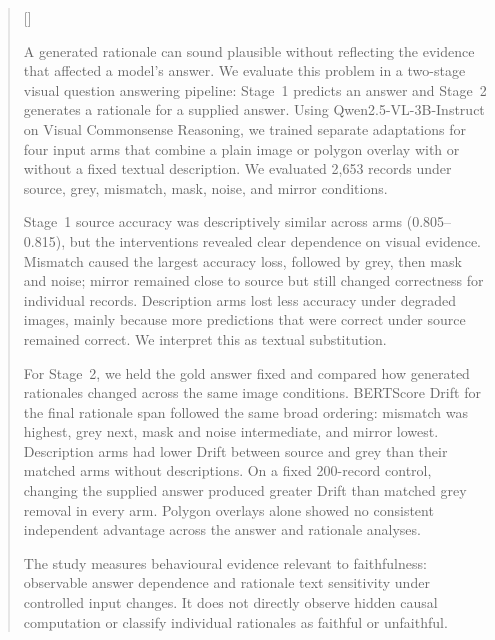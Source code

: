 \documentclass[
12pt,
oneside,
english,
onehalfspacing,
nolistspacing,
parskip,
headsepline,
]{MastersDoctoralThesis}
\begin{document}
\begin{abstract}[]
\addchaptertocentry{\abstractname}
\begin{singlespace}
\footnotesize
\setlength{\parskip}{0.1em}
\noindent A generated rationale can sound plausible without reflecting the
evidence that affected a model's answer. We evaluate this problem in a
two-stage visual question answering pipeline: Stage~1 predicts an answer and
Stage~2 generates a rationale for a supplied answer. Using
Qwen2.5-VL-3B-Instruct on Visual Commonsense Reasoning, we trained separate
adaptations for four input arms that combine a plain image or polygon overlay
with or without a fixed textual description. We evaluated 2,653 records under
source, grey, mismatch, mask, noise, and mirror conditions.

Stage~1 source accuracy was descriptively similar across arms
(0.805--0.815), but the interventions revealed clear dependence on visual
evidence. Mismatch caused the largest accuracy loss, followed by grey, then
mask and noise; mirror remained close to source but still changed correctness
for individual records. Description arms lost less accuracy under degraded images,
mainly because more predictions that were correct under source remained correct. We interpret
this as textual substitution.

For Stage~2, we held the gold answer fixed and compared how generated rationales
changed across the same image conditions. BERTScore Drift for the final rationale span followed the same broad
ordering: mismatch was highest, grey next, mask and noise intermediate, and
mirror lowest. Description arms had lower Drift between source and grey than their
matched arms without descriptions. On a fixed 200-record control, changing the
supplied answer produced greater Drift than matched grey removal in every arm.
Polygon overlays alone showed no consistent independent advantage across the
answer and rationale analyses.

The study measures behavioural evidence relevant to faithfulness: observable
answer dependence and rationale text sensitivity under controlled input
changes. It does not directly observe hidden causal computation or classify
individual rationales as faithful or unfaithful.

\end{singlespace}
\end{abstract}
\end{document}
